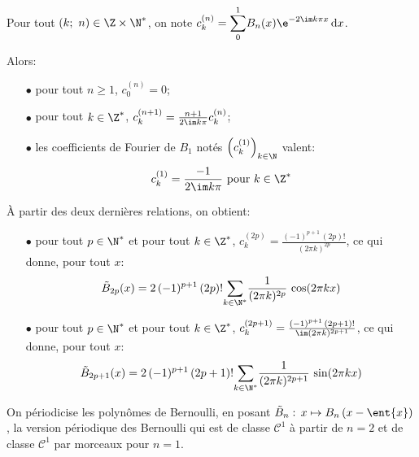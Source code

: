 \begin{prop}
Pour tout $(k;~n) \in \Z \times \N^*$, on note $c_k^{(n)} = \displaystyle{\sum_0^1} B_n(x) \e^{-2\im k \pi x} \, \mathrm d x$.

\medskip
Alors:
\begin{itemize}
\item[$\bullet$] 
pour tout $n \geq 1$, $c_0^{(n)} = 0$;
\item[$\bullet$] 
pour tout $k \in \Z^*$, $c_k^{(n+1)} = \frac{n+1}{2 \im k \pi} c_k^{(n)}$;
\item[$\bullet$] 
les coefficients de Fourier de $B_1$ notés $\left (c_k^{(1)}\right )_{k \in \N}$ valent:
\[
c_k^{(1)} = \frac{-1}{2 \im k \pi} \text{ pour }k \in \Z^*
\]
\end{itemize}

À partir des deux dernières relations, on obtient:
\begin{itemize}
\item[$\bullet$] 
pour tout $p \in \N^*$ et pour tout $k \in \Z^*$, $c_k^{(2p)} = \frac{(-1)^{p+1} \, (2p)!}{(2\pi k)^{2p}}$, ce qui donne, pour tout $x$:
\[
\tilde{B}_{2p}(x) = 2 \, (-1)^{p+1} \, (2p)! \displaystyle{\sum \limits_{k \in \N^*}} \frac{1}{(2\pi k)^{2p}} \, \cos(2 \pi k x)
\]
\item[$\bullet$] 
pour tout $p \in \N^*$ et pour tout $k \in \Z^*$, $c_k^{(2p+1)} = \frac{(-1)^{p+1} \, (2p+1)!}{\im (2\pi k)^{2p+1}}$, ce qui donne, pour tout $x$:
\[
\tilde{B}_{2p+1}(x) = 2 \, (-1)^{p+1} \, (2p+1)! \displaystyle{\sum \limits_{k \in \N^*}} \frac{1}{(2\pi k)^{2p+1}} \, \sin(2 \pi k x)
\]
\end{itemize}

On \og périodicise \fg{} les polynômes de Bernoulli, en posant $\tilde{B}_n: \, x \mapsto B_n\left ( x - \ent{x}\right )$, la version périodique des Bernoulli qui est de classe $\mathcal{C}^1$ à partir de $n=2$ et de classe $\mathcal{C}^1$ par morceaux pour $n=1$.
\end{prop}


